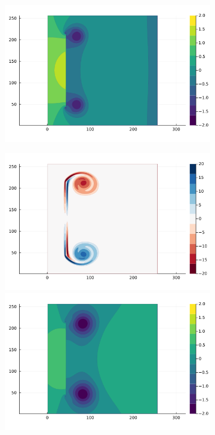 \documentclass[preprint,12pt]{elsarticle}
\begin{document}
\begin{figure}
\begin{subfigure}{.33\textwidth}
        \includegraphics[trim={4cm 1.5cm 5cm 7cm},clip,width=\textwidth]{tex/fig/Disk_biot_press_2.png}
    \end{subfigure}%
    \begin{subfigure}{.33\textwidth}
        \centering
         \includegraphics[trim={4cm 7.2cm 5cm 1cm},clip,width=\textwidth]{tex/fig/Disk_biot_omega_3.png}
        \includegraphics[trim={4cm 1.5cm 5cm 7cm},clip,width=\textwidth]{tex/fig/Disk_biot_press_3.png}

\end{subfigure}
\end{figure}
\end{document}
